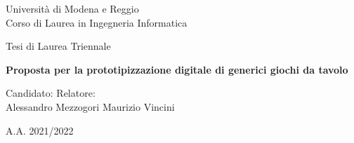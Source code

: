 \begin{titlepage}
\begin{center}
\vspace*{1cm}
\LARGE Università di Modena e Reggio \\
\large Corso di Laurea in Ingegneria Informatica \\
\vspace*{3cm}

\large
Tesi di Laurea Triennale
\vspace*{3cm}

\huge
\textbf{Proposta per la prototipizzazione digitale di generici giochi da tavolo}

\vspace*{4cm}
\large
Candidato:  \hfill Relatore: \\
Alessandro Mezzogori \hfill Maurizio Vincini

\vfill
\large A.A. 2021/2022

\end{center}
\end{titlepage}